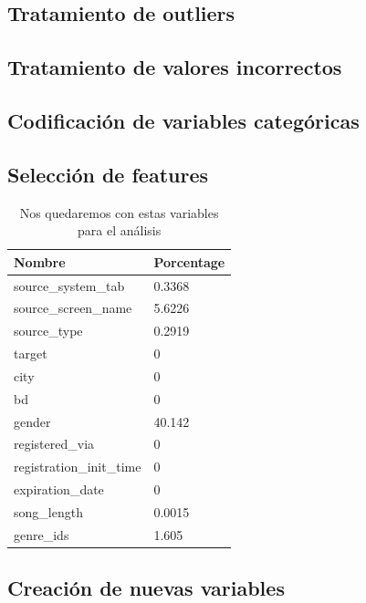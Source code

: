 \documentclass[a4paper]{article}
\begin{document}
\subsection{Tratamiento de outliers}

\subsection{Tratamiento de valores incorrectos}

\subsection{Codificación de variables categóricas}

\subsection{Selección de features}

\begin{table}[H]
\centering
\caption{Nos quedaremos con estas variables para el análisis}
\label{my-label}
\begin{tabular}{|l|l|}
\hline
Nombre                   & Porcentage \\ \hline
source\_system\_tab      & 0.3368     \\ \hline
source\_screen\_name     & 5.6226     \\ \hline
source\_type             & 0.2919     \\ \hline
target                   & 0          \\ \hline
city                     & 0          \\ \hline
bd                       & 0          \\ \hline
gender                   & 40.142     \\ \hline
registered\_via          & 0          \\ \hline
registration\_init\_time & 0          \\ \hline
expiration\_date         & 0          \\ \hline
song\_length             & 0.0015     \\ \hline
genre\_ids               & 1.605      \\ \hline
\end{tabular}
\end{table}

\subsection{Creación de nuevas variables}
\end{document}
